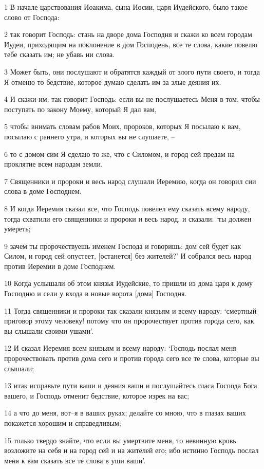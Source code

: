 \par 1 В начале царствования Иоакима, сына Иосии, царя Иудейского, было такое слово от Господа:
\par 2 так говорит Господь: стань на дворе дома Господня и скажи ко всем городам Иудеи, приходящим на поклонение в дом Господень, все те слова, какие повелю тебе сказать им; не убавь ни слова.
\par 3 Может быть, они послушают и обратятся каждый от злого пути своего, и тогда Я отменю то бедствие, которое думаю сделать им за злые деяния их.
\par 4 И скажи им: так говорит Господь: если вы не послушаетесь Меня в том, чтобы поступать по закону Моему, который Я дал вам,
\par 5 чтобы внимать словам рабов Моих, пророков, которых Я посылаю к вам, посылаю с раннего утра, и которых вы не слушаете, --
\par 6 то с домом сим Я сделаю то же, что с Силомом, и город сей предам на проклятие всем народам земли.
\par 7 Священники и пророки и весь народ слушали Иеремию, когда он говорил сии слова в доме Господнем.
\par 8 И когда Иеремия сказал все, что Господь повелел ему сказать всему народу, тогда схватили его священники и пророки и весь народ, и сказали: `ты должен умереть;
\par 9 зачем ты пророчествуешь именем Господа и говоришь: дом сей будет как Силом, и город сей опустеет, [останется] без жителей?' И собрался весь народ против Иеремии в доме Господнем.
\par 10 Когда услышали об этом князья Иудейские, то пришли из дома царя к дому Господню и сели у входа в новые ворота [дома] Господня.
\par 11 Тогда священники и пророки так сказали князьям и всему народу: `смертный приговор этому человеку! потому что он пророчествует против города сего, как вы слышали своими ушами'.
\par 12 И сказал Иеремия всем князьям и всему народу: `Господь послал меня пророчествовать против дома сего и против города сего все те слова, которые вы слышали;
\par 13 итак исправьте пути ваши и деяния ваши и послушайтесь гласа Господа Бога вашего, и Господь отменит бедствие, которое изрек на вас;
\par 14 а что до меня, вот--я в ваших руках; делайте со мною, что в глазах ваших покажется хорошим и справедливым;
\par 15 только твердо знайте, что если вы умертвите меня, то невинную кровь возложите на себя и на город сей и на жителей его; ибо истинно Господь послал меня к вам сказать все те слова в уши ваши'.
